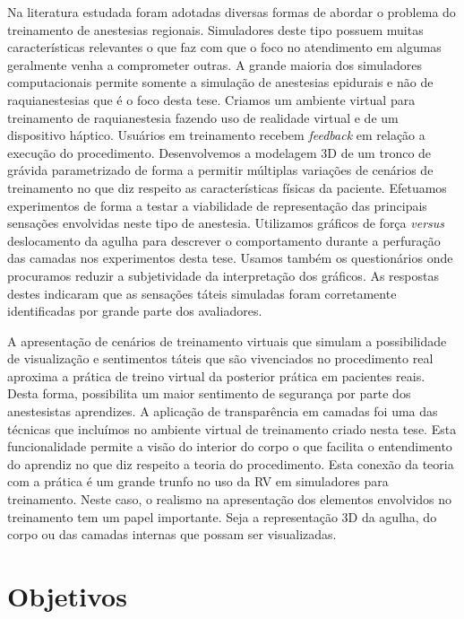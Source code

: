 Na literatura estudada foram adotadas diversas formas de abordar o problema do treinamento de anestesias regionais. Simuladores deste tipo possuem muitas características relevantes o que faz com que o foco no atendimento em algumas geralmente venha a comprometer outras. A grande maioria dos simuladores computacionais permite somente a simulação de anestesias epidurais e não de raquianestesias que é o foco desta tese. Criamos um ambiente virtual para treinamento de raquianestesia fazendo uso de realidade virtual e de um dispositivo háptico. Usuários em treinamento recebem \textit{feedback} em relação a execução do procedimento. Desenvolvemos a modelagem 3D de um tronco de grávida parametrizado de forma a permitir múltiplas variações de cenários de treinamento no que diz respeito as características físicas da paciente. Efetuamos experimentos de forma a testar a viabilidade de representação das principais sensações envolvidas neste tipo de anestesia. Utilizamos gráficos de força \textit{versus} deslocamento da agulha para descrever o comportamento durante a perfuração das camadas nos experimentos desta tese. Usamos também os questionários onde procuramos reduzir a subjetividade da interpretação dos gráficos. As respostas destes indicaram que as sensações táteis simuladas foram corretamente identificadas por grande parte dos avaliadores. 

A apresentação de cenários de treinamento virtuais que simulam a possibilidade de visualização e sentimentos táteis que são vivenciados no procedimento real aproxima a prática de treino virtual da posterior prática em pacientes reais. Desta forma, possibilita um maior sentimento de segurança por parte dos anestesistas aprendizes. A aplicação de transparência em camadas foi uma das técnicas que incluímos no ambiente virtual de treinamento criado nesta tese. Esta funcionalidade permite a visão do interior do corpo o que facilita o entendimento do aprendiz no que diz respeito a teoria do procedimento. Esta conexão da teoria com a prática é um grande trunfo no uso da \acrfull{RV} em simuladores para treinamento. Neste caso, o realismo na apresentação dos elementos envolvidos no treinamento tem um papel importante. Seja a representação 3D da agulha, do corpo ou das camadas internas que possam ser visualizadas. 

\section{Objetivos}
\label{sec:objetivos}

